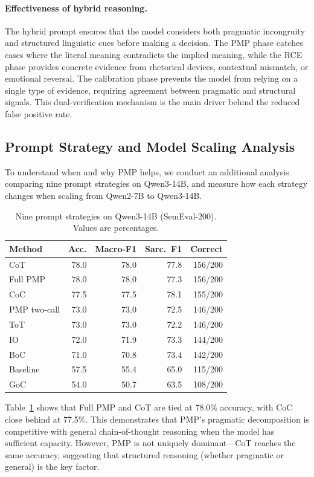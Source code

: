 \documentclass{article}
\begin{document}
\paragraph{Effectiveness of hybrid reasoning.}
The hybrid prompt ensures that the model considers both pragmatic incongruity and structured linguistic cues before making a decision. The PMP phase catches cases where the literal meaning contradicts the implied meaning, while the RCE phase provides concrete evidence from rhetorical devices, contextual mismatch, or emotional reversal. The calibration phase prevents the model from relying on a single type of evidence, requiring agreement between pragmatic and structural signals. This dual-verification mechanism is the main driver behind the reduced false positive rate.

\subsection{Prompt Strategy and Model Scaling Analysis}

To understand when and why PMP helps, we conduct an additional analysis comparing nine prompt strategies on Qwen3-14B, and measure how each strategy changes when scaling from Qwen2-7B to Qwen3-14B.

\begin{table}[t]
\centering
\small
\caption{Nine prompt strategies on Qwen3-14B (SemEval-200). Values are percentages.}
\label{tab:prompt-comp}
\begin{tabular}{lrrrr}
\toprule
Method & Acc. & Macro-F1 & Sarc.\ F1 & Correct \\
\midrule
CoT & 78.0 & 78.0 & 77.8 & 156/200 \\
Full PMP & 78.0 & 78.0 & 77.3 & 156/200 \\
CoC & 77.5 & 77.5 & 78.1 & 155/200 \\
PMP two-call & 73.0 & 73.0 & 72.5 & 146/200 \\
ToT & 73.0 & 73.0 & 72.2 & 146/200 \\
IO & 72.0 & 71.9 & 73.3 & 144/200 \\
BoC & 71.0 & 70.8 & 73.4 & 142/200 \\
Baseline & 57.5 & 55.4 & 65.0 & 115/200 \\
GoC & 54.0 & 50.7 & 63.5 & 108/200 \\
\bottomrule
\end{tabular}
\end{table}

Table~\ref{tab:prompt-comp} shows that Full PMP and CoT are tied at 78.0\% accuracy, with CoC close behind at 77.5\%. This demonstrates that PMP's pragmatic decomposition is competitive with general chain-of-thought reasoning when the model has sufficient capacity. However, PMP is not uniquely dominant---CoT reaches the same accuracy, suggesting that structured reasoning (whether pragmatic or general) is the key factor.
\end{document}
